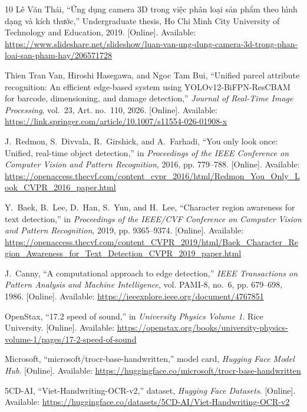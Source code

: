 \begin{thebibliography}{10}
Lê Văn Thái, ``{Ứng dụng camera 3D trong việc phân loại sản phẩm theo hình dạng
  và kích thước},'' Undergraduate thesis, Ho Chi Minh City University of
  Technology and Education, 2019. [Online]. Available:
  \url{https://www.slideshare.net/slideshow/luan-van-ung-dung-camera-3d-trong-phan-loai-san-pham-hay/206571728}

Thien Tran Van, Hiroshi Hasegawa, and Ngoc Tam Bui, ``Unified parcel attribute
  recognition: An efficient edge-based system using {YOLOv12-BiFPN-ResCBAM} for
  barcode, dimensioning, and damage detection,'' \emph{Journal of Real-Time
  Image Processing}, vol.~23, Art. no.~110, 2026. [Online]. Available:
  \url{https://link.springer.com/article/10.1007/s11554-026-01908-x}

J.~Redmon, S.~Divvala, R.~Girshick, and A.~Farhadi, ``You only look once:
  Unified, real-time object detection,'' in \emph{Proceedings of the IEEE
  Conference on Computer Vision and Pattern Recognition}, 2016, pp. 779--788.
  [Online]. Available:
  \url{https://openaccess.thecvf.com/content_cvpr_2016/html/Redmon_You_Only_Look_CVPR_2016_paper.html}

Y.~Baek, B.~Lee, D.~Han, S.~Yun, and H.~Lee, ``Character region awareness for
  text detection,'' in \emph{Proceedings of the IEEE/CVF Conference on Computer
  Vision and Pattern Recognition}, 2019, pp. 9365--9374. [Online]. Available:
  \url{https://openaccess.thecvf.com/content_CVPR_2019/html/Baek_Character_Region_Awareness_for_Text_Detection_CVPR_2019_paper.html}

J.~Canny, ``A computational approach to edge detection,'' \emph{IEEE
  Transactions on Pattern Analysis and Machine Intelligence}, vol. PAMI-8,
  no.~6, pp. 679--698, 1986. [Online]. Available:
  \url{https://ieeexplore.ieee.org/document/4767851}

OpenStax, ``17.2 speed of sound,'' in \emph{University Physics Volume 1}. Rice
  University. [Online]. Available:
  \url{https://openstax.org/books/university-physics-volume-1/pages/17-2-speed-of-sound}


Microsoft, ``{microsoft/trocr-base-handwritten},'' model card, \emph{Hugging
  Face Model Hub}. [Online]. Available:
  \url{https://huggingface.co/microsoft/trocr-base-handwritten}

5CD-AI, ``{Viet-Handwriting-OCR-v2},'' dataset, \emph{Hugging Face Datasets}.
  [Online]. Available:
  \url{https://huggingface.co/datasets/5CD-AI/Viet-Handwriting-OCR-v2}


\end{thebibliography}
